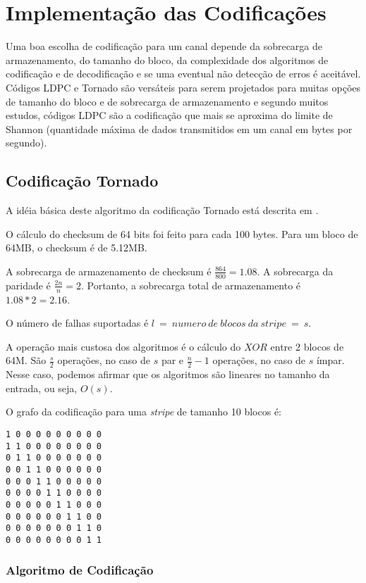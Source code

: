 \chapter{Implementação das Codificações}

Uma boa escolha de codificação para um canal depende da sobrecarga de armazenamento, do tamanho do bloco, da complexidade dos algoritmos de codificação e de decodificação e se uma eventual não detecção de erros é aceitável. Códigos LDPC e Tornado são versáteis para serem projetados para muitas opções de tamanho do bloco e de sobrecarga de armazenamento e segundo muitos estudos, códigos LDPC são a codificação que mais se aproxima do limite de Shannon (quantidade máxima de dados transmitidos em um canal em bytes por segundo).

\section{Codificação Tornado}

A idéia básica deste algoritmo da codificação Tornado está descrita em \cite{Woitaszek:2007,Stoten:2011}.

O cálculo do checksum de 64 bits foi feito para cada 100 bytes. Para um bloco de 64MB, o checksum é de 5.12MB.

A sobrecarga de armazenamento de checksum é $\frac{864}{800} = 1.08$. A sobrecarga da paridade é $\frac{2n}{n} = 2$. Portanto, a  sobrecarga total de armazenamento é $1.08*2 = 2.16$.

O número de falhas suportadas é $l\ =\ numero\ de\ blocos\ da\ stripe\ =\ s$.

A operação mais custosa dos algoritmos é o cálculo do $XOR$ entre 2 blocos de 64M. São $\frac{s}{2}$ operações, no caso de $s$ par e $\frac{n}{2}-1$ operações, no caso de $s$ ímpar. Nesse caso, podemos afirmar que os algoritmos são lineares no tamanho da entrada, ou seja, $O(s)$.

O grafo da codificação para uma \emph{stripe} de tamanho 10 blocos é:

\begin{verbatim}
1 0 0 0 0 0 0 0 0 0
1 1 0 0 0 0 0 0 0 0
0 1 1 0 0 0 0 0 0 0
0 0 1 1 0 0 0 0 0 0
0 0 0 1 1 0 0 0 0 0
0 0 0 0 1 1 0 0 0 0
0 0 0 0 0 1 1 0 0 0
0 0 0 0 0 0 1 1 0 0
0 0 0 0 0 0 0 1 1 0
0 0 0 0 0 0 0 0 1 1
\end{verbatim}


\subsection{Algoritmo de Codificação}

